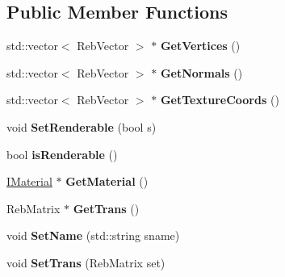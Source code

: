 \subsection*{Public Member Functions}
\begin{DoxyCompactItemize}
\item 
std\+::vector$<$ Reb\+Vector $>$ $\ast$ {\bfseries Get\+Vertices} ()\hypertarget{class_reb_g_l_vertex_buffer_aa5880a87cd9088538758b4f9f9b48526}{}\label{class_reb_g_l_vertex_buffer_aa5880a87cd9088538758b4f9f9b48526}

\item 
std\+::vector$<$ Reb\+Vector $>$ $\ast$ {\bfseries Get\+Normals} ()\hypertarget{class_reb_g_l_vertex_buffer_a9d67014ea389f55582bc8258d449563f}{}\label{class_reb_g_l_vertex_buffer_a9d67014ea389f55582bc8258d449563f}

\item 
std\+::vector$<$ Reb\+Vector $>$ $\ast$ {\bfseries Get\+Texture\+Coords} ()\hypertarget{class_reb_g_l_vertex_buffer_a67d9aa1dc0e7e4e2ad11f981f5b28f7a}{}\label{class_reb_g_l_vertex_buffer_a67d9aa1dc0e7e4e2ad11f981f5b28f7a}

\item 
void {\bfseries Set\+Renderable} (bool s)\hypertarget{class_reb_g_l_vertex_buffer_a197f9a7a752ee646589a4ae8ec0d424f}{}\label{class_reb_g_l_vertex_buffer_a197f9a7a752ee646589a4ae8ec0d424f}

\item 
bool {\bfseries is\+Renderable} ()\hypertarget{class_reb_g_l_vertex_buffer_a8f51e0f93d9005f0a1fc3219d9eb512b}{}\label{class_reb_g_l_vertex_buffer_a8f51e0f93d9005f0a1fc3219d9eb512b}

\item 
\hyperlink{class_i_material}{I\+Material} $\ast$ {\bfseries Get\+Material} ()\hypertarget{class_reb_g_l_vertex_buffer_a4e38e3762646f00d834fdcabb4236e58}{}\label{class_reb_g_l_vertex_buffer_a4e38e3762646f00d834fdcabb4236e58}

\item 
Reb\+Matrix $\ast$ {\bfseries Get\+Trans} ()\hypertarget{class_reb_g_l_vertex_buffer_a1a9da4ab0f85709bca88a74cd9689725}{}\label{class_reb_g_l_vertex_buffer_a1a9da4ab0f85709bca88a74cd9689725}

\item 
void {\bfseries Set\+Name} (std\+::string sname)\hypertarget{class_reb_g_l_vertex_buffer_a43904bd8c66cfbe9958bf25f64dc82df}{}\label{class_reb_g_l_vertex_buffer_a43904bd8c66cfbe9958bf25f64dc82df}

\item 
void {\bfseries Set\+Trans} (Reb\+Matrix set)\hypertarget{class_reb_g_l_vertex_buffer_ae9cf424d519e11617fd069c6832cf0a3}{}\label{class_reb_g_l_vertex_buffer_ae9cf424d519e11617fd069c6832cf0a3}


\end{DoxyCompactItemize}
